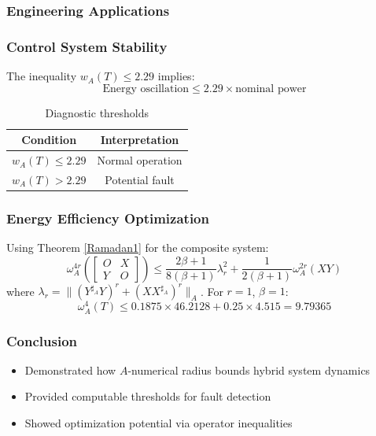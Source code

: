 \documentclass{article}
\begin{document}
\subsubsection*{Engineering Applications}
\subsubsection{Control System Stability}
The inequality $w_A(T) \leq 2.29$ implies:
\[
\text{Energy oscillation} \leq 2.29 \times \text{nominal power}
\]
\begin{table}[h]
\centering
{}
\begin{tabular}{|c|c|}
\hline
\textbf{Condition} & \textbf{Interpretation} \\
\hline
$w_A(T) \leq 2.29$ & Normal operation \\
$w_A(T) > 2.29$ & Potential fault \\
\hline
\end{tabular}
\caption{Diagnostic thresholds}
\end{table}

\subsubsection{Energy Efficiency Optimization}
Using Theorem \ref{Ramadan1}  for the composite system:
\[
\omega_{A}^{4r}\left(\begin{bmatrix} O & X \\ Y & O \end{bmatrix}\right) \leq \frac{2\beta+1}{8(\beta+1)}\lambda_r^2 + \frac{1}{2(\beta+1)}\omega_A^{2r}(XY)
\]
where $\lambda_r = \|(Y^{\sharp_A}Y)^r + (XX^{\sharp_A})^r\|_A$. For $r=1$, $\beta=1$:
\[
\omega_A^4(T) \leq 0.1875 \times 46.2128 + 0.25 \times 4.515 = 9.79365
\]

\subsubsection{Conclusion}
\begin{itemize}
\item Demonstrated how $A$-numerical radius bounds hybrid system dynamics
\item Provided computable thresholds for fault detection
\item Showed optimization potential via operator inequalities
\end{itemize}


\end{document}
